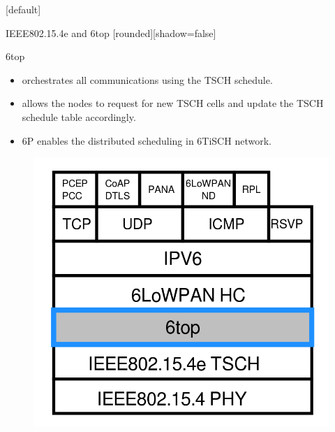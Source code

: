 \documentclass{beamer}
\makeatletter
\newenvironment{withoutheadline}{
        \setbeamertemplate{headline}[default]
        \def\beamer@entrycode{\vspace*{-\headheight}}
    }{}
\makeatother
\begin{document}
\begin{withoutheadline}
\begin{frame}{IEEE802.15.4e and 6top}
[rounded][shadow=false]


\begin{minipage}[t]{0.48\linewidth}

\begin{block}{6top}

    \begin{itemize}
    \item orchestrates all communications using the TSCH schedule.
    \item allows the nodes to request for new TSCH cells and update the TSCH schedule table accordingly.
    \item 6P enables the distributed scheduling in 6TiSCH network.
    \end{itemize}
    \end{block}

\end{minipage}\hfill
\begin{minipage}[t]{0.48\linewidth}
\centering
\begin{figure}[p]

\includegraphics[width=\linewidth]{layers.png}
\end{figure}
\end{minipage}


\end{frame}
\end{withoutheadline}
\end{document}

